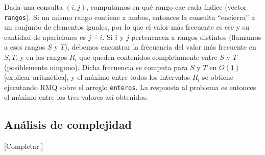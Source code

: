 Dada una consulta $(i,j)$, computamos en qué rango cae cada índice (vector
{\tt rangos}). Si un mismo rango contiene a ambos, entonces la consulta ``encierra''
a un conjunto de elementos iguales, por lo que el valor más frecuente es ese y
su cantidad de apariciones es $j-i$. Si $i$ y $j$ pertenencen a rangos distintos
(llamamos a esos rangos $S$ y $T$), debemos encontrar la frecuencia del valor más
frecuente en $S,T$, y en los rangos $R_i$ que queden contenidos completamente
entre $S$ y $T$ (posiblemente ninguno). Dicha frecuencia se computa para $S$ y
$T$ en $O(1)$ [explicar aritmética], y el máximo entre todos los intervalos $R_i$
se obtiene ejecutando RMQ sobre el arreglo {\tt enteros}. La respuesta al
problema es entonces el máximo entre los tres valores así obtenidos.

\subsection*{Análisis de complejidad}

[Completar.]



